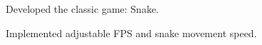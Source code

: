 \documentclass[letterpaper]{kevin-resume} %
\begin{document}
\begin{minipage}[t]{0.66\textwidth}
\sectionspace %


\begin{tightitemize}
 	\item Developed the classic game: Snake.
 	\item Implemented adjustable FPS and snake movement speed.
\end{tightitemize}

\sectionspace %


\end{minipage} %








\end{document}
